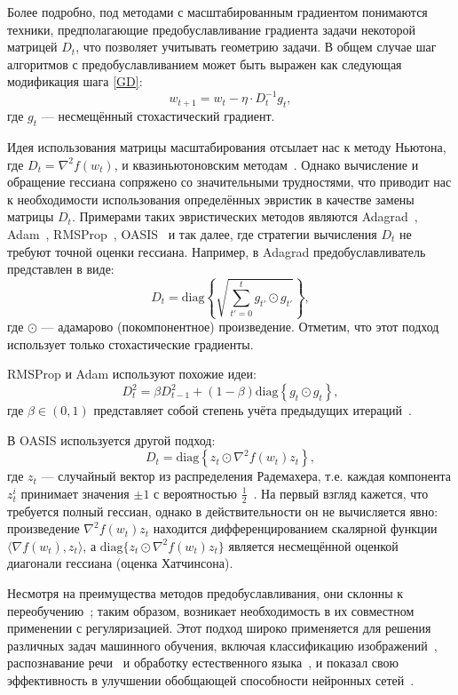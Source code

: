 Более подробно, под методами с масштабированным градиентом понимаются техники, предполагающие предобуславливание градиента задачи некоторой матрицей $D_t$, что позволяет учитывать геометрию задачи. В общем случае шаг алгоритмов с предобуславливанием может быть выражен как следующая модификация шага \eqref{GD}:
\begin{equation}
    w_{t+1} = w_t - \eta \cdot D_t^{-1} g_t,
\end{equation}
где $g_t$ --- несмещённый стохастический градиент.

Идея использования матрицы масштабирования отсылает нас к методу Ньютона, где $D_t = \nabla^2 f(w_t)$, и квазиньютоновским методам~\citep{dennis1977quasi}. Однако вычисление и обращение гессиана сопряжено со значительными трудностями, что приводит нас к необходимости использования определённых эвристик в качестве замены матрицы $D_t$. Примерами таких эвристических методов являются Adagrad~\citep{duchi2011adaptive}, Adam~\citep{kingma2014adam}, RMSProp~\citep{rmsprop}, OASIS~\citep{jahani2021doubly} и так далее, где стратегии вычисления $D_t$ не требуют точной оценки гессиана.
Например, в Adagrad предобуславливатель представлен в виде:
$$ D_t = \text{diag} \left\{ \sqrt{\sum_{t'=0}^t{g_{t'} \odot g_{t'}}} \right\}, $$
где $\odot$ --- адамарово (покомпонентное) произведение. Отметим, что этот подход использует только стохастические градиенты.

RMSProp и Adam используют похожие идеи:
$$ D_t^2 = \beta D_{t-1}^2 + (1 - \beta) \text{diag} \left\{ g_{t} \odot g_{t} \right\}, $$
где $\beta \in (0, 1)$ представляет собой степень учёта предыдущих итераций~\citep{kingma2014adam}.

В OASIS используется другой подход:
$$ D_t = \text{diag} \left\{ z_t \odot \nabla^2 f(w_t) z_t \right\}, $$
где $z_t$ --- случайный вектор из распределения Радемахера, т.е. каждая компонента $z_t^i$ принимает значения $\pm 1$ с вероятностью $\frac{1}{2}$~\citep{jahani2021doubly}. На первый взгляд кажется, что требуется полный гессиан, однако в действительности он не вычисляется явно: произведение $\nabla^2 f(w_t) z_t$ находится дифференцированием скалярной функции $\langle \nabla f(w_t), z_t \rangle$, а $\text{diag}\{z_t \odot \nabla^2 f(w_t) z_t\}$ является несмещённой оценкой диагонали гессиана (оценка Хатчинсона).

Несмотря на преимущества методов предобуславливания, они склонны к переобучению~\citep{wilson2017marginal}; таким образом, возникает необходимость в их совместном применении с регуляризацией. Этот подход широко применяется для решения различных задач машинного обучения, включая классификацию изображений~\citep{zhu2017learning}, распознавание речи~\citep{zhou2017improved} и обработку естественного языка~\citep{wu2022stgn}, и показал свою эффективность в улучшении обобщающей способности нейронных сетей~\citep{girosi1995regularization}.

